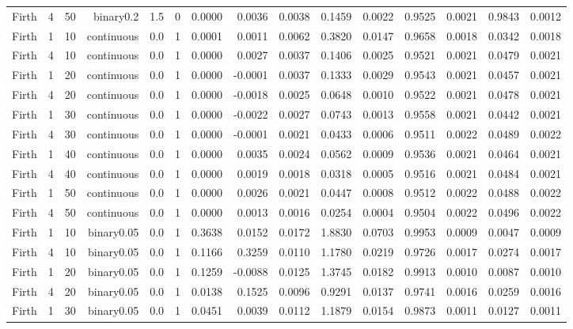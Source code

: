 \begin{longtable}{rrrrrrrrrrrrrrr}
  Firth & 4 & 50 & binary0.2 & 1.5 & 0 & 0.0000 & 0.0036 & 0.0038 & 0.1459 & 0.0022 & 0.9525 & 0.0021 & 0.9843 & 0.0012 \\ 
  Firth & 1 & 10 & continuous & 0.0 & 1 & 0.0001 & 0.0011 & 0.0062 & 0.3820 & 0.0147 & 0.9658 & 0.0018 & 0.0342 & 0.0018 \\ 
  Firth & 4 & 10 & continuous & 0.0 & 1 & 0.0000 & 0.0027 & 0.0037 & 0.1406 & 0.0025 & 0.9521 & 0.0021 & 0.0479 & 0.0021 \\ 
  Firth & 1 & 20 & continuous & 0.0 & 1 & 0.0000 & -0.0001 & 0.0037 & 0.1333 & 0.0029 & 0.9543 & 0.0021 & 0.0457 & 0.0021 \\ 
  Firth & 4 & 20 & continuous & 0.0 & 1 & 0.0000 & -0.0018 & 0.0025 & 0.0648 & 0.0010 & 0.9522 & 0.0021 & 0.0478 & 0.0021 \\ 
  Firth & 1 & 30 & continuous & 0.0 & 1 & 0.0000 & -0.0022 & 0.0027 & 0.0743 & 0.0013 & 0.9558 & 0.0021 & 0.0442 & 0.0021 \\ 
  Firth & 4 & 30 & continuous & 0.0 & 1 & 0.0000 & -0.0001 & 0.0021 & 0.0433 & 0.0006 & 0.9511 & 0.0022 & 0.0489 & 0.0022 \\ 
  Firth & 1 & 40 & continuous & 0.0 & 1 & 0.0000 & 0.0035 & 0.0024 & 0.0562 & 0.0009 & 0.9536 & 0.0021 & 0.0464 & 0.0021 \\ 
  Firth & 4 & 40 & continuous & 0.0 & 1 & 0.0000 & 0.0019 & 0.0018 & 0.0318 & 0.0005 & 0.9516 & 0.0021 & 0.0484 & 0.0021 \\ 
  Firth & 1 & 50 & continuous & 0.0 & 1 & 0.0000 & 0.0026 & 0.0021 & 0.0447 & 0.0008 & 0.9512 & 0.0022 & 0.0488 & 0.0022 \\ 
  Firth & 4 & 50 & continuous & 0.0 & 1 & 0.0000 & 0.0013 & 0.0016 & 0.0254 & 0.0004 & 0.9504 & 0.0022 & 0.0496 & 0.0022 \\ 
  Firth & 1 & 10 & binary0.05 & 0.0 & 1 & 0.3638 & 0.0152 & 0.0172 & 1.8830 & 0.0703 & 0.9953 & 0.0009 & 0.0047 & 0.0009 \\ 
  Firth & 4 & 10 & binary0.05 & 0.0 & 1 & 0.1166 & 0.3259 & 0.0110 & 1.1780 & 0.0219 & 0.9726 & 0.0017 & 0.0274 & 0.0017 \\ 
  Firth & 1 & 20 & binary0.05 & 0.0 & 1 & 0.1259 & -0.0088 & 0.0125 & 1.3745 & 0.0182 & 0.9913 & 0.0010 & 0.0087 & 0.0010 \\ 
  Firth & 4 & 20 & binary0.05 & 0.0 & 1 & 0.0138 & 0.1525 & 0.0096 & 0.9291 & 0.0137 & 0.9741 & 0.0016 & 0.0259 & 0.0016 \\ 
  Firth & 1 & 30 & binary0.05 & 0.0 & 1 & 0.0451 & 0.0039 & 0.0112 & 1.1879 & 0.0154 & 0.9873 & 0.0011 & 0.0127 & 0.0011 \\ 

\end{longtable}
